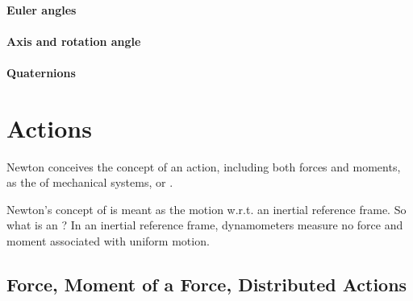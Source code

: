 \documentclass[letterpaper,10pt,english]{jupyterBook}
\begin{document}
\subsubsection{Euler angles}
\label{\detokenize{ch/kinematics-rotations:euler-angles}}\label{\detokenize{ch/kinematics-rotations:classical-mechanics-kinematics-rotations-param-euler}}

\subsubsection{Axis and rotation angle}
\label{\detokenize{ch/kinematics-rotations:axis-and-rotation-angle}}\label{\detokenize{ch/kinematics-rotations:classical-mechanics-kinematics-rotations-param-axis}}

\subsubsection{Quaternions}
\label{\detokenize{ch/kinematics-rotations:quaternions}}\label{\detokenize{ch/kinematics-rotations:classical-mechanics-kinematics-rotations-param-quaternions}}
\sphinxstepscope




\chapter{Actions}
\label{\detokenize{ch/actions:actions}}\label{\detokenize{ch/actions:classical-mechanics-actions}}\label{\detokenize{ch/actions::doc}}
\sphinxAtStartPar
{} Newton conceives the concept of an action, including both forces and moments, as the  of mechanical systems, or .

\sphinxAtStartPar
Newton’s concept of  is meant as the motion w.r.t. an inertial reference frame. So what is an ? In an inertial reference frame, dynamometers measure no force and moment associated with uniform motion.





\sphinxstepscope


\section{Force, Moment of a Force, Distributed Actions}
\label{\detokenize{ch/actions-types:force-moment-of-a-force-distributed-actions}}\label{\detokenize{ch/actions-types:physics-hs-mechanics-actions-def}}\label{\detokenize{ch/actions-types::doc}}
\end{document}
